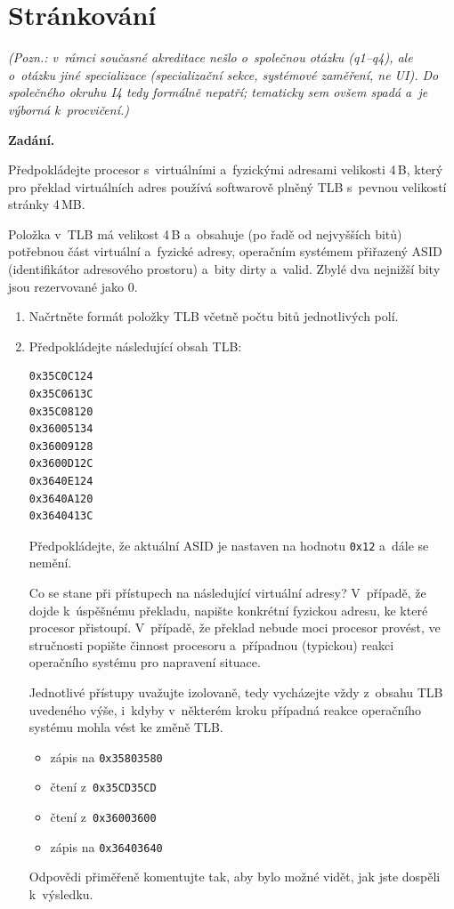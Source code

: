 \section{Stránkování}
\noindent\textit{(Pozn.: v~rámci současné akreditace nešlo o~společnou otázku (q1--q4), ale o~otázku jiné specializace (specializační sekce, systémové zaměření, ne UI). Do společného okruhu I4 tedy formálně nepatří; tematicky sem ovšem spadá a~je výborná k~procvičení.)}\par

\noindent\textbf{Zadání.}\par
Předpokládejte procesor s~virtuálními a~fyzickými adresami velikosti 4\,B, který pro
překlad virtuálních adres používá softwarově plněný TLB s~pevnou velikostí stránky 4\,MB.

Položka v~TLB má velikost 4\,B a~obsahuje (po řadě od nejvyšších bitů) potřebnou část
virtuální a~fyzické adresy, operačním systémem přiřazený ASID (identifikátor adresového
prostoru) a~bity dirty a~valid. Zbylé dva nejnižší bity jsou rezervované jako 0.

\begin{enumerate}
\item Načrtněte formát položky TLB včetně počtu bitů jednotlivých polí.
\item Předpokládejte následující obsah TLB:

\begin{lstlisting}
0x35C0C124
0x35C0613C
0x35C08120
0x36005134
0x36009128
0x3600D12C
0x3640E124
0x3640A120
0x3640413C
\end{lstlisting}

Předpokládejte, že aktuální ASID je nastaven na hodnotu \texttt{0x12} a~dále se nemění.

Co se stane při přístupech na následující virtuální adresy? V~případě, že dojde
k~úspěšnému překladu, napište konkrétní fyzickou adresu, ke které procesor přistoupí.
V~případě, že překlad nebude moci procesor provést, ve stručnosti popište činnost
procesoru a~případnou (typickou) reakci operačního systému pro napravení situace.

Jednotlivé přístupy uvažujte izolovaně, tedy vycházejte vždy z~obsahu TLB uvedeného výše,
i~kdyby v~některém kroku případná reakce operačního systému mohla vést ke změně TLB.

\begin{itemize}
\item zápis na \texttt{0x35803580}
\item čtení z~\texttt{0x35CD35CD}
\item čtení z~\texttt{0x36003600}
\item zápis na \texttt{0x36403640}
\end{itemize}

Odpovědi přiměřeně komentujte tak, aby bylo možné vidět, jak jste dospěli k~výsledku.
\end{enumerate}

